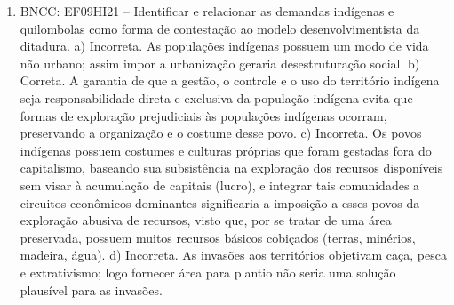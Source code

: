 \begin{enumerate}
\item
BNCC: EF09HI21 -- Identificar e relacionar as demandas indígenas e quilombolas
como forma de contestação ao modelo desenvolvimentista da ditadura.
a) Incorreta. As populações indígenas possuem um modo de vida não urbano;
assim impor a urbanização geraria desestruturação social.
b) Correta. A garantia de que a gestão, o controle e o uso do território
indígena seja responsabilidade direta e exclusiva da população indígena
evita que formas de exploração prejudiciais às populações indígenas
ocorram, preservando a organização e o costume desse povo.
c) Incorreta. Os povos indígenas possuem costumes e culturas próprias que
foram gestadas fora do capitalismo, baseando sua subsistência na
exploração dos recursos disponíveis sem visar à acumulação de capitais
(lucro), e integrar tais comunidades a circuitos econômicos dominantes
significaria a imposição a esses povos da exploração abusiva de recursos, visto que, por se tratar de uma área preservada, possuem muitos
recursos básicos cobiçados (terras, minérios, madeira, água).
d) Incorreta. As invasões aos territórios objetivam caça, pesca e
extrativismo; logo fornecer área para plantio não seria uma solução
plausível para as invasões.
\end{enumerate}
